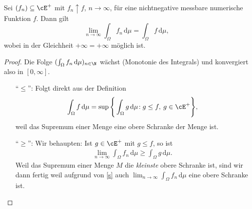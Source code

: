 \marginpar{\textcolor{red}{Vorlesung 10}}

\begin{lemma}\label{monKonv}
	Sei $(f_n) \subseteq \cE^+$ mit $f_n \uparrow f$, $n \to \infty$, für eine nichtnegative messbare numerische Funktion $f$. Dann gilt
	\[ \lim_{n \to \infty} \int_{\Omega} f_n \, \mathrm{d}\mu = \int_{\Omega} f \, \mathrm{d}\mu, \]
	wobei in der Gleichheit $ + \infty = + \infty$ m\"oglich ist. 
\end{lemma}

\begin{proof}
	Die Folge $(\int_{\Omega} f_n \, \mathrm{d}\mu)_{n \in \N}$ wächst (Monotonie des Integrals) und konvergiert also in $[0, \infty]$.
	\begin{itemize}
		\item [\enquote{$\leq$}:] Folgt direkt aus der Definition \[ \int_{\Omega} f \,\mathrm{d}\mu = \sup \Bigg\{ \int_{\Omega} g\, \mathrm{d}\mu \! : g \leq f, \: g \in \cE^+ \Bigg\},\]
		weil das Supremum einer Menge eine obere Schranke der Menge ist.
		\item [\enquote{$\geq$}:] Wir behaupten: Ist $ g \in \cE^+$ mit $ g \leq f$, so ist 
		\begin{align}\label{s}
			\lim_{n \to \infty} \int_{\Omega} f_n \,\mathrm{d}\mu \geq \int_{\Omega} g \,\mathrm{d}\mu.
		\end{align}
		 Weil das Supremum einer Menge $M$ die \textit{kleinste} obere Schranke ist, sind wir dann fertig weil aufgrund von \eqref{s} auch $\lim_{n \to \infty} \int_{\Omega} f_n \,\mathrm{d}\mu$ eine obere Schranke ist.\smallskip
		

\end{itemize}
\end{proof}
